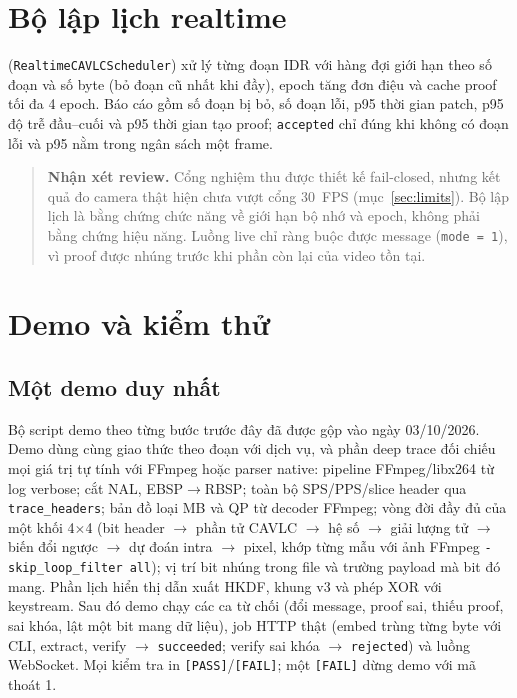 \documentclass[10pt,a4paper]{article}
\newcommand{\review}[1]{\begin{quote}\colorbox{ReviewBg}{\parbox{0.94\linewidth}{\textbf{Nhận xét review.} #1}}\end{quote}}
\begin{document}
\section{Bộ lập lịch realtime}

 (\texttt{RealtimeCAVLCScheduler}) xử lý từng đoạn IDR với hàng đợi giới hạn theo số đoạn và số byte (bỏ đoạn cũ nhất khi đầy), epoch tăng đơn điệu và cache proof tối đa 4 epoch. Báo cáo gồm số đoạn bị bỏ, số đoạn lỗi, p95 thời gian patch, p95 độ trễ đầu--cuối và p95 thời gian tạo proof; \texttt{accepted} chỉ đúng khi không có đoạn lỗi và p95 nằm trong ngân sách một frame.

\review{Cổng nghiệm thu được thiết kế fail-closed, nhưng kết quả đo camera thật hiện chưa vượt cổng 30~FPS (mục~\ref{sec:limits}). Bộ lập lịch là bằng chứng chức năng về giới hạn bộ nhớ và epoch, không phải bằng chứng hiệu năng. Luồng live chỉ ràng buộc được message (\texttt{mode = 1}), vì proof được nhúng trước khi phần còn lại của video tồn tại.}

\section{Demo và kiểm thử}

\subsection{Một demo duy nhất}

Bộ script demo theo từng bước trước đây đã được gộp vào  ngày 03/10/2026. Demo dùng cùng giao thức theo đoạn với dịch vụ, và phần deep trace đối chiếu mọi giá trị tự tính với FFmpeg hoặc parser native: pipeline FFmpeg/libx264 từ log verbose; cắt NAL, EBSP$\rightarrow$RBSP; toàn bộ SPS/PPS/slice header qua \texttt{trace\_headers}; bản đồ loại MB và QP từ decoder FFmpeg; vòng đời đầy đủ của một khối 4$\times$4 (bit header $\rightarrow$ phần tử CAVLC $\rightarrow$ hệ số $\rightarrow$ giải lượng tử $\rightarrow$ biến đổi ngược $\rightarrow$ dự đoán intra $\rightarrow$ pixel, khớp từng mẫu với ảnh FFmpeg \texttt{-skip\_loop\_filter all}); vị trí bit nhúng trong file và trường payload mà bit đó mang. Phần lịch hiển thị dẫn xuất HKDF, khung v3 và phép XOR với keystream. Sau đó demo chạy các ca từ chối (đổi message, proof sai, thiếu proof, sai khóa, lật một bit mang dữ liệu), job HTTP thật (embed trùng từng byte với CLI, extract, verify $\rightarrow$ \texttt{succeeded}; verify sai khóa $\rightarrow$ \texttt{rejected}) và luồng WebSocket. Mọi kiểm tra in \texttt{[PASS]}/\texttt{[FAIL]}; một \texttt{[FAIL]} dừng demo với mã thoát 1.
\end{document}
